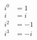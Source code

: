 \documentclass[a4paper,12pt]{article}
\author{m7tkr}
\begin{document}
\begin{align*}
&i^{0} &= 1 \\
&i &= i \\
&i^{2} &= -1 \\
&i^{3} &= -i
\end{align*}
\end{document}
